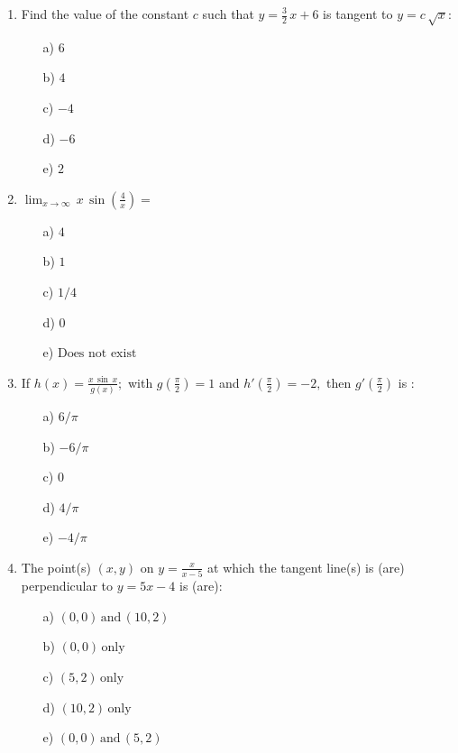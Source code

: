 \documentclass[dvips, 12pt,a4paper]{article}
\begin{document}
\begin{enumerate}
\newpage


\item Find  the value of the constant $c$ such that $\displaystyle y=\frac{3}{2}\,x+6$ is tangent to $y=c\,\sqrt{x}:$
\\[0.2in]
\begin{itemize}
\item [a)]$\displaystyle 6$
\item [b)]$\displaystyle 4$
\item [c)]$\displaystyle -4$
\item [d)]$\displaystyle -6$
\item [e)]$\displaystyle 2$
\end{itemize}

\vspace{0.8in}

\item $\displaystyle \lim_{x\rightarrow\infty} \,x\,\sin\left(\frac{4}{x}\right)=$
\\[0.2in]
\begin{itemize}
\item [a)]$\displaystyle 4$
\item [b)]$\displaystyle 1$
\item [c)]$\displaystyle 1/4$
\item [d)]$\displaystyle 0$
\item [e)]$\displaystyle \mbox{Does not exist}$
\end{itemize}

\newpage


\item If $\displaystyle h(x)=\frac{x\,\sin\,x}{g(x)};$ with $g\left(\displaystyle\frac{\pi}{2}\right)=1$ and $h'\left(\displaystyle\frac{\pi}{2}\right)=-2,$ then $g'\left(\displaystyle \frac{\pi}{2}\right)$ is :
\\[0.2in]
\begin{itemize}
\item [a)]$6/\pi$
\item [b)]$-6/\pi$
\item [c)]$0$
\item [d)]$4/\pi$
\item [e)]$-4/\pi$
\end{itemize}

\vspace{0.8in}

\item The point(s) $(x,y)$ on $\displaystyle y=\frac{x}{x-5}$ at which the tangent line(s) is (are) perpendicular to $y=5x-4$ is (are):
\\[0.2in]
\begin{itemize}
\item [a)]$(0,0) \,\mbox{and}\,(10,2)$
\item [b)]$(0,0)\,\mbox{only}$
\item [c)]$(5,2)\,\mbox{only}$
\item [d)]$(10,2)\,\mbox{only}$
\item [e)]$(0,0) \,\mbox{and}\,(5,2)$
\end{itemize}



\end{enumerate}
\end{document}
